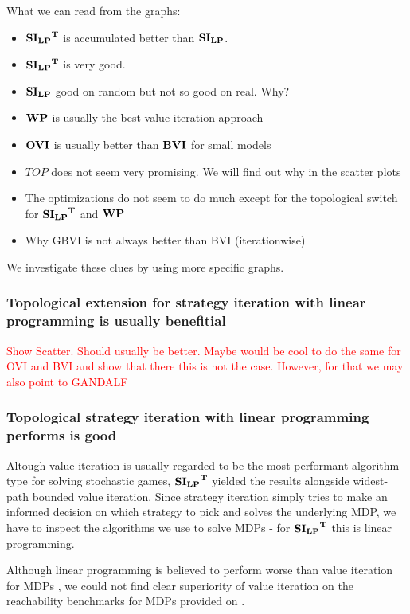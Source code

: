 What we can read from the graphs:
\begin{itemize}
    \item $\mathbf{\mathbf{SI_{LP}}^T}$ is accumulated better than $\mathbf{SI_{LP}}$.
    \item $\mathbf{\mathbf{SI_{LP}}^T}$ is very good.
    \item $\mathbf{SI_{LP}}$ good on random but not so good on real. Why?
    \item $\mathbf{WP}$ is usually the best value iteration approach
    \item $\mathbf{OVI}$ is usually better than $\mathbf{BVI}$ for small models
    \item $TOP$ does not seem very promising. We will find out why in the scatter plots
    \item The optimizations do not seem to do much except for the topological switch for $\mathbf{\mathbf{SI_{LP}}^T}$ and $\mathbf{WP}$
    \item Why GBVI is not always better than BVI (iterationwise)
\end{itemize}

We investigate these clues by using more specific graphs.

\subsubsection*{Topological extension for strategy iteration with linear programming is usually benefitial}
\textcolor{red}{Show Scatter. Should usually be better. 
Maybe would be cool to do the same for OVI and BVI and show that there this is not the case. However, for that we may also point to GANDALF}

\subsubsection*{Topological strategy iteration with linear programming performs is good}
Altough value iteration is usually regarded to be the most performant algorithm type for solving stochastic games, 
$\mathbf{\mathbf{SI_{LP}}^T}$ yielded the results alongside widest-path bounded value iteration.
Since strategy iteration simply tries to make an informed decision on which strategy to pick and solves the underlying MDP, 
we have to inspect the algorithms we use to solve MDPs - for $\mathbf{\mathbf{SI_{LP}}^T}$ this is linear programming.

Although linear programming is believed to perform worse than value iteration for MDPs \cite{ANYTHING?},
we could not find clear superiority of value iteration on the reachability benchmarks for MDPs provided on \cite{QComps}.

